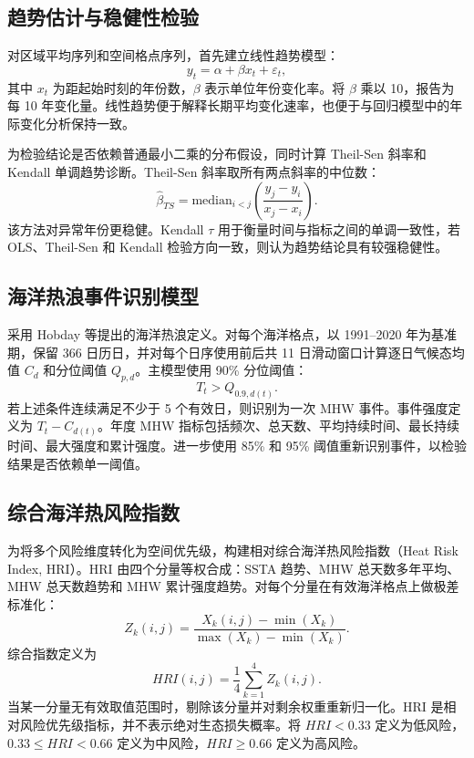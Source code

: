 \documentclass[UTF8,a4paper,zihao=-4,fontset=fandol]{ctexart}
\begin{document}
\subsection{趋势估计与稳健性检验}
对区域平均序列和空间格点序列，首先建立线性趋势模型：
\begin{equation}
y_t=\alpha+\beta x_t+\varepsilon_t,
\end{equation}
其中 $x_t$ 为距起始时刻的年份数，$\beta$ 表示单位年份变化率。将 $\beta$ 乘以 10，报告为每 10 年变化量。线性趋势便于解释长期平均变化速率，也便于与回归模型中的年际变化分析保持一致。

为检验结论是否依赖普通最小二乘的分布假设，同时计算 Theil-Sen 斜率和 Kendall 单调趋势诊断。Theil-Sen 斜率取所有两点斜率的中位数：
\begin{equation}
\hat{\beta}_{TS}=\mathrm{median}_{i<j}\left(\frac{y_j-y_i}{x_j-x_i}\right).
\end{equation}
该方法对异常年份更稳健。Kendall $\tau$ 用于衡量时间与指标之间的单调一致性，若 OLS、Theil-Sen 和 Kendall 检验方向一致，则认为趋势结论具有较强稳健性。

\subsection{海洋热浪事件识别模型}
采用 Hobday 等\cite{hobday2016mhw}提出的海洋热浪定义。对每个海洋格点，以 1991--2020 年为基准期，保留 366 日历日，并对每个日序使用前后共 11 日滑动窗口计算逐日气候态均值 $C_d$ 和分位阈值 $Q_{p,d}$。主模型使用 90\% 分位阈值：
\begin{equation}
T_t>Q_{0.9,d(t)}.
\end{equation}
若上述条件连续满足不少于 5 个有效日，则识别为一次 MHW 事件。事件强度定义为 $T_t-C_{d(t)}$。年度 MHW 指标包括频次、总天数、平均持续时间、最长持续时间、最大强度和累计强度。进一步使用 85\% 和 95\% 阈值重新识别事件，以检验结果是否依赖单一阈值。

\subsection{综合海洋热风险指数}
为将多个风险维度转化为空间优先级，构建相对综合海洋热风险指数（Heat Risk Index, HRI）。HRI 由四个分量等权合成：SSTA 趋势、MHW 总天数多年平均、MHW 总天数趋势和 MHW 累计强度趋势。对每个分量在有效海洋格点上做极差标准化：
\begin{equation}
Z_k(i,j)=\frac{X_k(i,j)-\min(X_k)}{\max(X_k)-\min(X_k)}.
\end{equation}
综合指数定义为
\begin{equation}
HRI(i,j)=\frac{1}{4}\sum_{k=1}^{4}Z_k(i,j).
\end{equation}
当某一分量无有效取值范围时，剔除该分量并对剩余权重重新归一化。HRI 是相对风险优先级指标，并不表示绝对生态损失概率。将 $HRI<0.33$ 定义为低风险，$0.33\leq HRI<0.66$ 定义为中风险，$HRI\geq0.66$ 定义为高风险。
\end{document}

